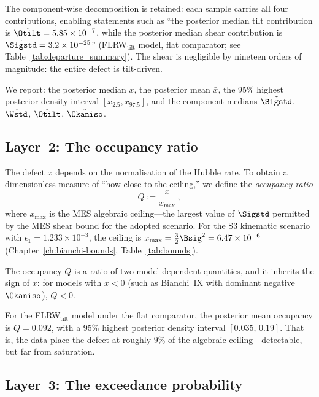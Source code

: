 The component-wise decomposition is retained: each sample
carries all four contributions, enabling statements such as
``the posterior median tilt contribution is
$\tilde{\Otilt} = 5.85 \times 10^{-7}$, while the posterior
median shear contribution is
$\tilde{\Sigstd} = 3.2 \times 10^{-25}$''
(FLRW$_{\mathrm{tilt}}$ model, flat comparator; see
Table~\ref{tab:departure_summary}).  The shear is negligible by
nineteen orders of magnitude: the entire defect is tilt-driven.

\begin{definition}
\label{def:x-summaries}
We report:
the posterior median $\tilde{x}$,
the posterior mean $\bar{x}$,
the 95\% highest posterior density interval
$[x_{2.5}, x_{97.5}]$,
and the component medians
$\tilde{\Sigstd}$, $\tilde{\Wstd}$,
$\tilde{\Otilt}$, $\tilde{\Okaniso}$.
\end{definition}


\subsection{Layer~2: The occupancy ratio}
\label{sec:layer2}

The defect $x$ depends on the normalisation of the Hubble rate.
To obtain a dimensionless measure of ``how close to the
ceiling,'' we define the \emph{occupancy ratio}
\begin{equation}\label{eq:Q-def}
Q := \frac{x}{x_{\max}}\,,
\end{equation}
where $x_{\max}$ is the MES algebraic ceiling---the largest
value of $\Sigstd$ permitted by the MES shear bound for
the adopted scenario.
For the S3 kinematic scenario with $\epsilon_1 = 1.233
\times 10^{-3}$, the ceiling is
$x_{\max} = \frac{3}{2}\Bsig^2 = 6.47 \times 10^{-6}$
(Chapter~\ref{ch:bianchi-bounds},
Table~\ref{tab:bounds}).

The occupancy $Q$ is a ratio of two model-dependent
quantities, and it inherits the sign of $x$: for models with
$x < 0$ (such as Bianchi~IX with dominant negative $\Okaniso$),
$Q < 0$.

For the FLRW$_{\mathrm{tilt}}$ model under the flat comparator,
the posterior mean occupancy is $\bar{Q} = 0.092$, with a 95\%
highest posterior density interval
$[0.035,\, 0.19]$.  That is, the data place the defect at
roughly $9\%$ of the algebraic ceiling---detectable, but far
from saturation.


\subsection{Layer~3: The exceedance probability}
\label{sec:layer3}

